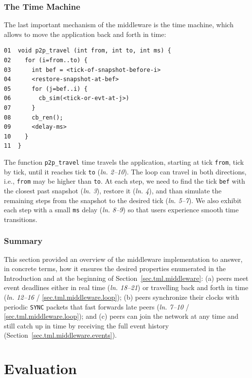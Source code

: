 \documentclass[10pt,journal,compsoc]{IEEEtran}
\newcommand{\code}[1]  {\texttt{\footnotesize{#1}}}
\newcommand{\lin}[1]{(\emph{ln. #1}\xspace)}
\newcommand{\linx}[1]{\emph{ln. #1}\xspace}
\begin{document}
\subsubsection{The Time Machine}
\label{sec.tml.middleware.travel}

The last important mechanism of the middleware is the time machine, which
allows to move the application back and forth in time:

{\footnotesize
\begin{verbatim}
01  void p2p_travel (int from, int to, int ms) {
02    for (i=from..to) {
03      int bef = <tick-of-snapshot-before-i>
04      <restore-snapshot-at-bef>
05      for (j=bef..i) {
06        cb_sim(<tick-or-evt-at-j>)
07      }
08      cb_ren();
09      <delay-ms>
10    }
11  }
\end{verbatim}
}

The function \code{p2p\_travel} time travels the application, starting at tick
\code{from}, tick by tick, until it reaches tick \code{to} \lin{2--10}.
The loop can travel in both directions, i.e., \code{from} may be higher than
\code{to}.
At each step, we need to find the tick \code{bef} with the closest past
snapshot \lin{3}, restore it \lin{4}, and than simulate the remaining steps
from the snapshot to the desired tick \lin{5--7}.
We also exhibit each step with a small \code{ms} delay \lin{8--9} so that users
experience smooth time transitions.

\subsubsection{Summary}
\label{sec.tml.middleware.summary}

This section provided an overview of the middleware implementation to answer,
in concrete terms, how it ensures the desired properties enumerated in the
Introduction and at the beginning of Section~\ref{sec.tml.middleware}:
    (a) peers meet event deadlines either in real time \lin{18--21} or
        travelling back and forth in time
        (\linx{12--16} / \ref{sec.tml.middleware.loop});
    (b) peers synchronize their clocks with periodic \code{SYNC} packets that
        fast forwards late peers
        (\linx{7--10} / \ref{sec.tml.middleware.loop}); and
    (c) peers can join the network at any time and still catch up in time by
        receiving the full event history
        (Section~\ref{sec.tml.middleware.events}).

\section{Evaluation}
\label{sec.eval}
\end{document}
